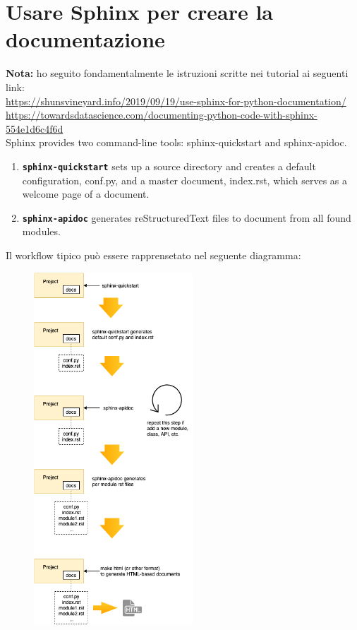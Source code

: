 \chapter{Usare Sphinx per creare la documentazione}

\textbf{Nota:} ho seguito fondamentalmente le istruzioni scritte nei tutorial ai seguenti link:\\
\url{https://shunsvineyard.info/2019/09/19/use-sphinx-for-python-documentation/}\\
\url{https://towardsdatascience.com/documenting-python-code-with-sphinx-554e1d6c4f6d}\\

Sphinx provides two command-line tools: sphinx-quickstart and sphinx-apidoc.
\begin{enumerate}
    \item \textbf{\texttt{sphinx-quickstart}} sets up a source directory and creates a default configuration, conf.py, and a master document, index.rst, which serves as a welcome page of a document.
    \item \textbf{\texttt{sphinx-apidoc}} generates reStructuredText files to document from all found modules.
\end{enumerate}
\noindent
Il workflow tipico può essere rapprensetato nel seguente diagramma:

\begin{figure}[ht]
    \centering
    \includegraphics[width=0.53\textwidth]{images/sphinx_workflow.png}
\end{figure}
\FloatBarrier

